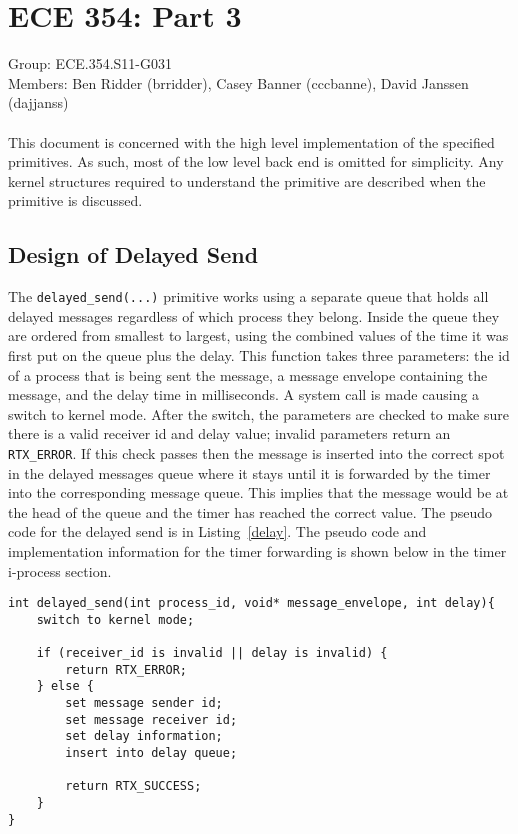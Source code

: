 \documentclass[oneside]{article}
\begin{document}
\lstset{language=C, 
        frame=single, 
        breaklines=true,
        basicstyle=\small\ttfamily,
        columns=fullflexible}
\section*{ECE 354: Part 3}
Group: ECE.354.S11-G031 \\
Members: Ben Ridder (brridder), Casey Banner (cccbanne), 
David Janssen (dajjanss) \\ \\
This document is concerned with the high level implementation of the 
specified primitives. As such, most of the low level back end is omitted for
simplicity. Any kernel structures required to understand the primitive are
described when the primitive is discussed.

\subsection*{Design of Delayed Send} 
The \texttt{delayed\_send(...)} primitive works using a separate queue that
holds all delayed messages regardless of which process they belong. Inside
the queue they are ordered from smallest to largest, using the combined values
of the time it was first put on the queue plus the delay.  This function takes
three parameters: the id of a process that is being sent the message, a
message envelope containing the message, and the delay time in milliseconds. A
system call is made causing a switch to kernel mode.  After the switch, the
parameters are checked to make sure there is a valid receiver id and delay
value; invalid parameters return an \texttt{RTX\_ERROR}. If this check passes
then the message is inserted into the correct spot in the delayed messages
queue where it stays until it is forwarded by the timer into the corresponding
message queue. This implies that the message would be at the head of the queue
and the timer has reached the correct value. The pseudo code for the delayed
send is in Listing~\ref{delay}. The pseudo code and implementation information
for the timer forwarding is shown below in the timer i-process section.

\begin{lstlisting}
int delayed_send(int process_id, void* message_envelope, int delay){
    switch to kernel mode;

    if (receiver_id is invalid || delay is invalid) {
        return RTX_ERROR;
    } else {
        set message sender id;
        set message receiver id;
        set delay information;
        insert into delay queue;

        return RTX_SUCCESS;
    }
}
\end{lstlisting}
\end{document}

